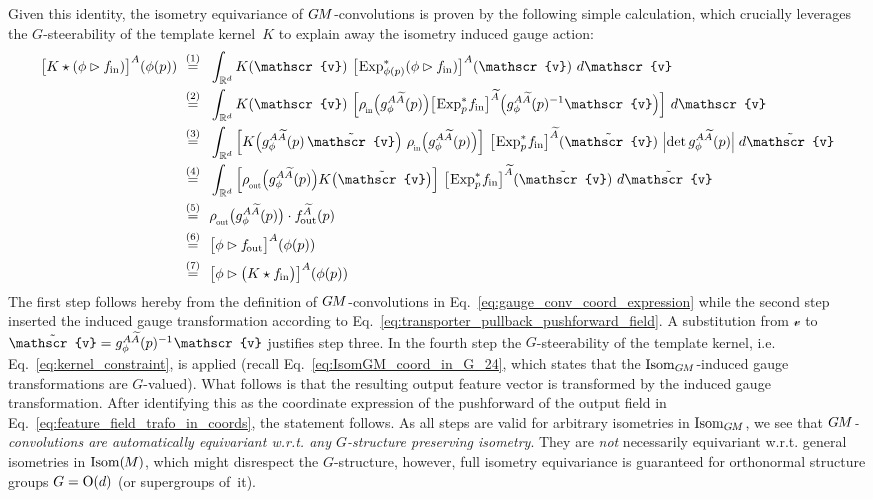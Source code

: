 Given this identity, the isometry equivariance of $G\mkern-1.4muM$-convolutions
is proven by the following simple calculation, which crucially leverages the $G$-steerability of the template kernel~$K$ to explain away the isometry induced gauge action:
\begin{align}
    \big[ K \star (\phi \rhd \fin) \big]^A (\phi(p))
    \ \overset{(1)}{=}&\ \ 
        \int_{\R^d} K(\mathscr{v})\  \big[\mkern-2mu \Expsphip (\phi\rhd\fin) \big]^A (\mathscr{v})\ d\mathscr{v} \notag \\
    \ \overset{(2)}{=}&\ \ 
        \int_{\R^d} K(\mathscr{v})\ 
        \Big[ \rhoin\pig( g_\phi^{A\widetilde{A}}(p)\pig) \big[\mkern-2mu \Expspfin\big]^{\widetilde{A}} \pig(g_\phi^{A\widetilde{A}}(p)^{-1} \mathscr{v} \pig) \Big]\ d\mathscr{v} \notag \\
    \ \overset{(3)}{=}&\ \ 
        \int_{\R^d} \Big[ K\pig( g_\phi^{A\widetilde{A}}(p)\, \tilde{\mathscr{v}}\pig)\ \rhoin\pig( g_\phi^{A\widetilde{A}}(p)\pig) \Big]\ 
        \big[\mkern-2mu \Expspfin\big]^{\widetilde{A}} (\tilde{\mathscr{v}})\ 
        \pig|\mkern-3mu\det g_\phi^{A\widetilde{A}}(p)\pig|\; d\tilde{\mathscr{v}} \notag \\
    \ \overset{(4)}{=}&\ \ 
        \int_{\R^d} \Big[\rhoout\pig( g_\phi^{A\widetilde{A}}(p)\pig)  K\big(\tilde{\mathscr{v}}\big) \Big]\ 
        \big[\mkern-2mu \Expspfin\big]^{\widetilde{A}} (\tilde{\mathscr{v}})\ d\tilde{\mathscr{v}} \notag \\
    \ \overset{(5)}{=}&\ \ 
        \rhoout\big( g_\phi^{A\widetilde{A}}(p) \big) \cdot \fout^{\widetilde{A}}(p) \notag \\
    \ \overset{(6)}{=}&\ \ 
        \big[ \phi \rhd \fout \big]^A (\phi(p)) \notag \\
    \ \overset{(7)}{=}&\ \ 
        \big[ \phi \rhd \big(K \star \fin\big) \big]^A (\phi(p))
\end{align}
The first step follows hereby from the definition of $G\mkern-1.4muM$-convolutions in Eq.~\eqref{eq:gauge_conv_coord_expression} while the second step inserted the induced gauge transformation according to Eq.~\eqref{eq:transporter_pullback_pushforward_field}.
A substitution from $\mathscr{v}$ to $\tilde{\mathscr{v}} = g_\phi^{A\widetilde{A}}(p)^{-1} \mkern1mu \mathscr{v}$ justifies step three.
In the fourth step the $G$-steerability of the template kernel, i.e. Eq.~\eqref{eq:kernel_constraint}, is applied (recall Eq.~\eqref{eq:IsomGM_coord_in_G_24}, which states that the $\operatorname{Isom}_{G\mkern-1.4muM}$-induced gauge transformations are $G$-valued).
What follows is that the resulting output feature vector is transformed by the induced gauge transformation.
After identifying this as the coordinate expression of the pushforward of the output field in Eq.~\eqref{eq:feature_field_trafo_in_coords}, the statement follows.
As all steps are valid for arbitrary isometries in $\operatorname{Isom}_{G\mkern-1.4muM}$, we see that \emph{$G\mkern-1.4muM$-convolutions are automatically equivariant w.r.t. any $G$-structure preserving isometry}.
They are \emph{not} necessarily equivariant w.r.t. general isometries in $\operatorname{Isom}(\mkern-1.5mu M \mkern-.5mu)$, which might disrespect the $G$-structure, however, full isometry equivariance is guaranteed for orthonormal structure groups $G=\operatorname{O}(d)$ (or supergroups of~it).



